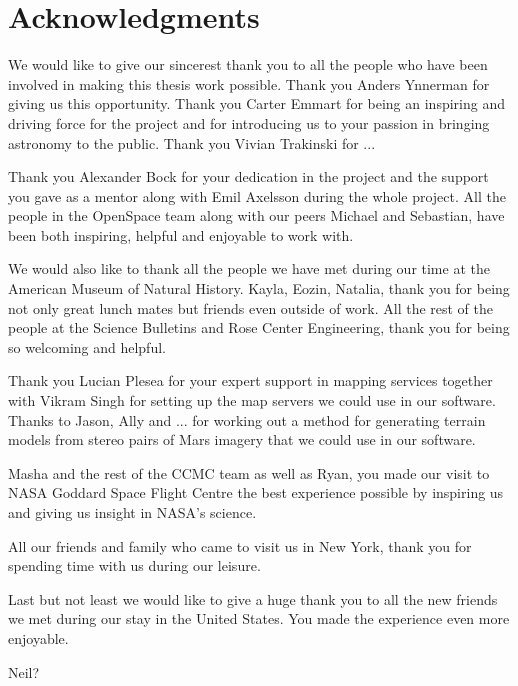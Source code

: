 \cleardoublepage
{}
{}
\chapter*{Acknowledgments}

We would like to give our sincerest thank you to all the people who have been involved in making this thesis work possible. Thank you Anders Ynnerman for giving us this opportunity. Thank you Carter Emmart for being an inspiring and driving force for the project and for introducing us to your passion in bringing astronomy to the public. Thank you Vivian Trakinski for ...

Thank you Alexander Bock for your dedication in the project and the support you gave as a mentor along with Emil Axelsson during the whole project. All the people in the OpenSpace team along with our peers Michael and Sebastian, have been both inspiring, helpful and enjoyable to work with.

We would also like to thank all the people we have met during our time at the American Museum of Natural History. Kayla, Eozin, Natalia, thank you for being not only great lunch mates but friends even outside of work.
All the rest of the people at the Science Bulletins and Rose Center Engineering, thank you for being so welcoming and helpful.

Thank you Lucian Plesea for your expert support in mapping services together with Vikram Singh for setting up the map servers we could use in our software. Thanks to Jason, Ally and ... for working out a method for generating terrain models from stereo pairs of Mars imagery that we could use in our software.

Masha and the rest of the CCMC team as well as Ryan, you made our visit to NASA Goddard Space Flight Centre the best experience possible by inspiring us and giving us insight in NASA's science.

All our friends and family who came to visit us in New York, thank you for spending time with us during our leisure.

Last but not least we would like to give a huge thank you to all the new friends we met during our stay in the United States. You made the experience even more enjoyable.

Neil?

\newpage
